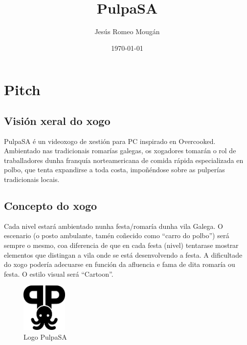 \documentclass{report}  %
\title{PulpaSA}  %
\author{Jesús Romeo Mougán}                     %
\date{\today}                           %
\begin{document}
\captionsetup{aboveskip=5pt, belowskip=10pt}



\renewcommand{\contentsname}{Índice}

\tableofcontents


\newpage

\section{Pitch}

\subsection{Visión xeral do xogo}
PulpaSA é un videoxogo de xestión para PC inspirado en Overcooked. Ambientado nas tradicionais romarías galegas, os xogadores tomarán o rol de traballadores dunha franquía norteamericana de comida rápida especializada en polbo, que tenta expandirse a toda costa, impoñéndose sobre as pulperías tradicionais locais.

\subsection{Concepto do xogo}

Cada nivel estará ambientado nunha festa/romaría dunha vila Galega. O 
escenario (o posto ambulante, tamén coñecido como “carro do polbo”) será 
sempre o mesmo, coa diferencia de que en cada festa (nivel) tentarase 
mostrar elementos que distingan a vila onde se está desenvolvendo a festa. A 
dificultade do xogo podería adecuarse en función da afluencia e fama de dita 
romaría ou festa. O estilo visual será “Cartoon”.

\begin{figure}[h]
    \centering
    \includegraphics[width=0.2\textwidth]{images/pulpasa_logo.png}
    \caption{Logo PulpaSA}
    \label{fig:Boceto Logo PulpaSA}
\end{figure}
\end{document}
